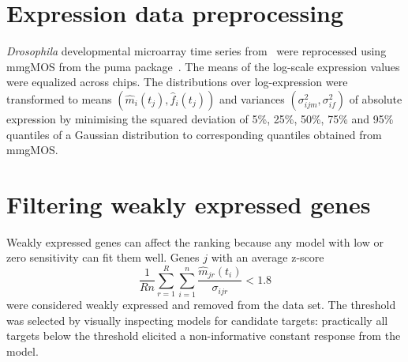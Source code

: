 \documentclass{pnastwo}
\begin{document}
\begin{article}
\begin{materials}
  \section{Expression data preprocessing} \emph{Drosophila} developmental
  microarray time series from~\cite{Tomancak2002} were reprocessed
  using mmgMOS from the puma package~\cite{Pearson2009}.  The means of
  the log-scale expression values were equalized across chips.  The
  distributions over log-expression were transformed to means
  $\left(\hat{m}_i(t_j), \hat{f}_i(t_j)\right)$ and variances $\left(\sigma_{ijm}^2,
  \sigma_{if}^2 \right)$ of absolute expression by minimising the squared
  deviation of 5\%, 25\%, 50\%, 75\% and 95\% quantiles of a Gaussian
  distribution to corresponding quantiles obtained from mmgMOS.

  \section{Filtering weakly expressed genes}
  Weakly expressed genes can affect the ranking because any model
  with low or zero sensitivity can fit them
  well. Genes $j$ with an average z-score 
  $$ \frac{1}{Rn} \sum_{r=1}^R \sum_{i=1}^n \frac{\hat{m}_{jr}(t_i)}{\sigma_{ijr}} < 1.8 $$
  were considered weakly expressed and removed from the data set.  The threshold
  was selected by visually inspecting models for candidate targets:
  practically all targets below the threshold elicited a
  non-informative constant response from the model.
  

\end{materials}
\end{article}
\end{document}
